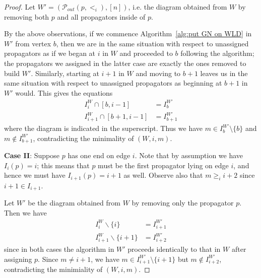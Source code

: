\documentclass[11pt]{article}
\newcommand{\cP}{\mathcal{P}}
\theoremstyle{remark}
\theoremstyle{definition}
\begin{document}
\begin{proof}
Let $W' = (\cP_{out}(p,<_i), [n])$, i.e. the diagram obtained from $W$ by removing both $p$ and all propagators inside of $p$.

By the above observations, if we commence Algorithm~\ref{alg:put GN on WLD} in $W'$ from vertex $b$, then we are in the same situation with respect to unassigned propagators as if we began at $i$ in $W$ and proceeded to $b$ following the algorithm; the propagators we assigned in the latter case are exactly the ones removed to build $W'$.  Similarly, starting at $i+1$ in $W$ and moving to $b+1$ leaves us in the same situation with respect to unassigned propagators as beginning at $b+1$ in $W'$ would.  This gives the equations
\begin{align*}
  I_i^{W} \cap [b,i-1] & = I_b^{W'} \\
  I_{i+1}^{W} \cap [b+1,i-1] & = I_{b+1}^{W'}
\end{align*}
where the diagram is indicated in the superscript.
Thus we have $m\in I_b^{W'}\setminus\{b\}$ and $m\not\in I_{b+1}^{W'}$, contradicting the minimality of $(W, i, m)$.

\textbf{Case II}: Suppose $p$ has one end on edge $i$.  Note that by assumption we have $I_i(p) = i$; this means that $p$ must be the first propagator lying on edge $i$, and hence we must have $I_{i+1}(p) = i+1$ as well.  Observe also that $m\geq_i i+2$ since $i+1\in I_{i+1}$.

Let $W'$ be the diagram obtained from $W$ by removing only the propagator $p$.  Then we have
\begin{align*}
  I_i^{W} \backslash \{i\} & = I_{i+1}^{W'} \\
  I_{i+1}^{W} \backslash \{i+1\} & = I_{i+2}^{W'}
\end{align*}
since in both cases the algorithm in $W'$ proceeds identically to that in $W$ after assigning $p$. Since $m \neq i+1$, we have $m\in I_{i+1}^{W'}\setminus\{i+1\}$ but $m\not\in I_{i+2}^{W'}$, contradicting the minimiality of $(W, i, m)$.


\end{proof}
\end{document}
